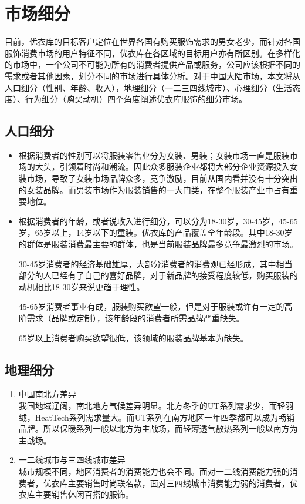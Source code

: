 \documentclass{xjtureport}
\begin{document}
\section{市场细分}
目前，优衣库的目标客户定位在世界各国有购买服饰需求的男女老少，而针对各国服饰消费市场的用户特征不同，优衣库在各区域的目标用户亦有所区别。在多样化的市场中，一个公司不可能为所有的消费者提供产品或服务，公司应该根据不同的需求或者其他因素，划分不同的市场进行具体分析。对于中国大陆市场，本文将从人口细分（性别、年龄、收入），地理细分（一二三四线城市）、心理细分（生活态度）、行为细分（购买动机）四个角度阐述优衣库服饰的细分市场。
\subsection{人口细分}
\begin{itemize}
    \item 根据消费者的性别可以将服装零售业分为女装、男装；女装市场一直是服装市场的大头，引领着时尚和潮流。因此众多服装企业都将大部分企业资源投入女装市场，导致了女装市场品牌众多，竞争激励，目前从国内看并没有十分突出的女装品牌。而男装市场作为服装销售的一大门类，在整个服装产业中占有重要地位。
    \item 根据消费者的年龄，或者说收入进行细分，可以分为18-30岁，30-45岁，45-65岁，65岁以上，14岁以下的童装。优衣库的产品覆盖全年龄段。其中18-30岁的群体是服装消费最主要的群体，也是当前服装品牌最多竞争最激烈的市场。
    
    30-45岁消费者的经济基础雄厚，大部分消费者的消费观已经形成，其中相当部分的人已经有了自己的喜好品牌，对于新品牌的接受程度较低，购买服装的动机相比18-30岁来说更趋于理性。

    45-65岁消费者事业有成，服装购买欲望一般，但是对于服装或许有一定的高阶需求（品牌或定制），该年龄段的消费者所需品牌严重缺失。

    65岁以上消费者购买欲望很低，该领域的服装品牌基本为缺失。
\end{itemize}
\subsection{地理细分}
\begin{enumerate}
    \item 中国南北方差异\\
    我国地域辽阔，南北地方气候差异明显。北方冬季的UT系列需求少，而轻羽绒，HeatTech系列需求量大。而UT系列在南方地区一年四季都可以成为畅销品牌。所以保暖系列一般以北方为主战场，而轻薄透气散热系列一般以南方为主战场。
    \item 一二线城市与三四线城市差异\\
    城市规模不同，地区消费者的消费能力也会不同。面对一二线消费能力强的消费者，优衣库主要销售时尚联名款，面对三四线城市消费能力弱的消费者，优衣库主要销售休闲百搭的服饰。
\end{enumerate}
\end{document}
